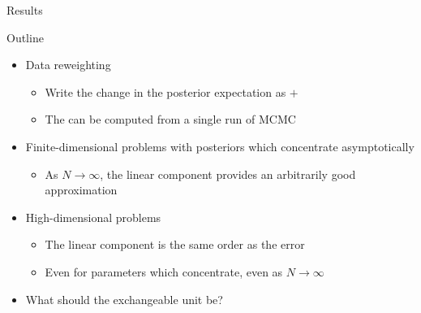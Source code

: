 \begin{frame}{Results}

\spskip
{}
%
%
\end{frame}



\begin{frame}{Outline}
%
\begin{itemize}
%
\item Data reweighting
%
\begin{itemize}
%
\item Write the change in the posterior expectation
    as  $+$ 
\item The  can be computed from a
single run of MCMC
%
\end{itemize}

\pause
%
\item Finite-dimensional problems with posteriors which concentrate
asymptotically
%
\begin{itemize}
%
\item As $N \rightarrow \infty$, the linear component provides
an arbitrarily good approximation
%
\end{itemize}
%
\pause
\item High-dimensional problems
\begin{itemize}
%
\item The linear component is the same order as the error
\item Even for parameters which concentrate, even as
$N \rightarrow \infty$

\pause
\end{itemize}
\item What should the exchangeable unit be?
%
\end{itemize}
%
\end{frame}
